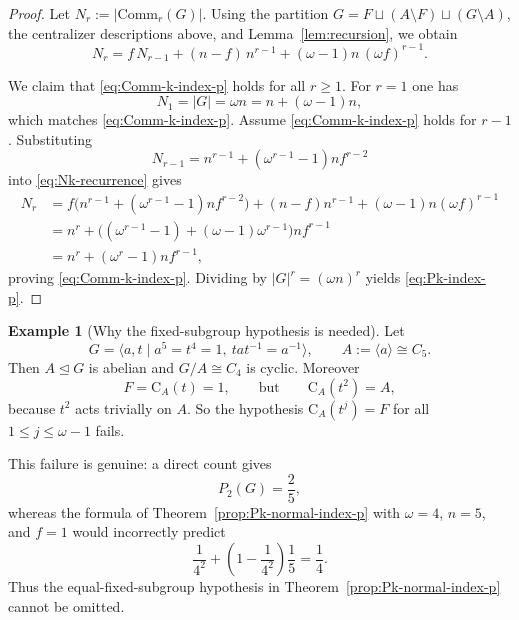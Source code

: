\documentclass[11pt]{article}
\theoremstyle{definition}
\theoremstyle{remark}
\theoremstyle{definition}
\newtheorem{example}[theorem]{Example}
\theoremstyle{plain}
\newcommand{\C}{\mathrm{C}}
\newcommand{\Comm}{\mathrm{Comm}}
\begin{document}
\begin{proof}
Let $N_r:=|\Comm_r(G)|$.
Using the partition $G=F\sqcup (A\setminus F)\sqcup (G\setminus A)$, the centralizer descriptions above, and Lemma~\ref{lem:recursion}, we obtain
\begin{equation}\label{eq:Nk-recurrence}
N_r = f\,N_{r-1} + (n-f)\,n^{r-1} + (\omega-1)n\,(\omega f)^{r-1}.
\end{equation}

We claim that \eqref{eq:Comm-k-index-p} holds for all $r\ge 1$.
For $r=1$ one has
\[
N_1=|G|=\omega n=n+(\omega-1)n,
\]
which matches \eqref{eq:Comm-k-index-p}.
Assume \eqref{eq:Comm-k-index-p} holds for $r-1$.
Substituting
\[
N_{r-1}=n^{r-1}+(\omega^{r-1}-1)n f^{r-2}
\]
into \eqref{eq:Nk-recurrence} gives
\begin{align*}
N_r
&= f\bigl(n^{r-1}+(\omega^{r-1}-1)n f^{r-2}\bigr)+(n-f)n^{r-1}+(\omega-1)n(\omega f)^{r-1} \\
&= n^r+\bigl((\omega^{r-1}-1)+(\omega-1)\omega^{r-1}\bigr)n f^{r-1} \\
&= n^r+(\omega^r-1)n f^{r-1},
\end{align*}
proving \eqref{eq:Comm-k-index-p}.
Dividing by $|G|^r=(\omega n)^r$ yields \eqref{eq:Pk-index-p}.
\end{proof}

\begin{example}[Why the fixed-subgroup hypothesis is needed]\label{ex:cyclic-index-omega-nonfaithful}
Let
\[
G=\langle a,t \mid a^5=t^4=1,\ t a t^{-1}=a^{-1}\rangle,
\qquad
A:=\langle a\rangle\cong C_5.
\]
Then $A\trianglelefteq G$ is abelian and $G/A\cong C_4$ is cyclic.
Moreover
\[
F=\C_A(t)=1,
\qquad\text{but}\qquad
\C_A(t^2)=A,
\]
because $t^2$ acts trivially on $A$.
So the hypothesis $\C_A(t^j)=F$ for all $1\le j\le \omega-1$ fails.

This failure is genuine: a direct count gives
\[
P_2(G)=\frac{2}{5},
\]
whereas the formula of Theorem~\ref{prop:Pk-normal-index-p} with $\omega=4$, $n=5$, and $f=1$
would incorrectly predict
\[
\frac{1}{4^2}+\left(1-\frac{1}{4^2}\right)\frac{1}{5}=\frac14.
\]
Thus the equal-fixed-subgroup hypothesis in Theorem~\ref{prop:Pk-normal-index-p} cannot be omitted.
\end{example}
\end{document}
